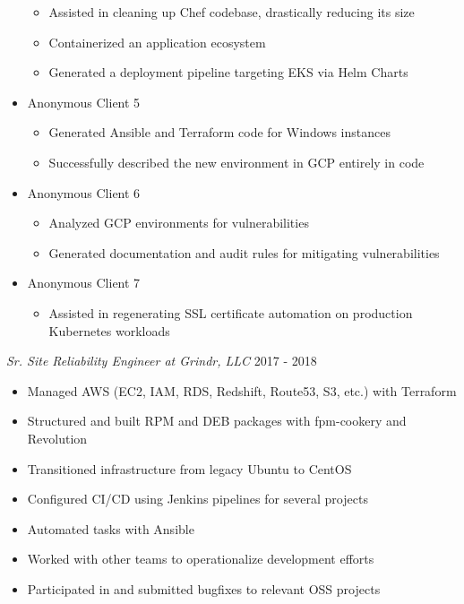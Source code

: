\documentclass[line]{docs/resume/res}
\begin{document}
\begin{resume}
\begin{itemize}
    \begin{itemize} \itemsep -2pt
      \item Assisted in cleaning up Chef codebase, drastically reducing its size
      \item Containerized an application ecosystem
      \item Generated a deployment pipeline targeting EKS via Helm Charts
    \end{itemize}
    \item Anonymous Client 5
    \begin{itemize} \itemsep -2pt
      \item Generated Ansible and Terraform code for Windows instances
      \item Successfully described the new environment in GCP entirely in code
    \end{itemize}
    \item Anonymous Client 6
    \begin{itemize} \itemsep -2pt
      \item Analyzed GCP environments for vulnerabilities
      \item Generated documentation and audit rules for mitigating vulnerabilities
    \end{itemize}
    \item Anonymous Client 7
    \begin{itemize} \itemsep -2pt
      \item Assisted in regenerating SSL certificate automation on production \\
        Kubernetes workloads
    \end{itemize}
  \end{itemize}

  {\sl Sr. Site Reliability Engineer at Grindr, LLC} \hfill 2017 - 2018
  \begin{itemize} \itemsep -2pt %
    \item Managed AWS (EC2, IAM, RDS, Redshift, Route53, S3, etc.) with Terraform
    \item Structured and built RPM and DEB packages with fpm-cookery and Revolution
    \item Transitioned infrastructure from legacy Ubuntu to CentOS
    \item Configured CI/CD using Jenkins pipelines for several projects
    \item Automated tasks with Ansible
    \item Worked with other teams to operationalize development efforts
    \item Participated in and submitted bugfixes to relevant OSS projects
  \end{itemize}


\end{resume}
\end{document}

